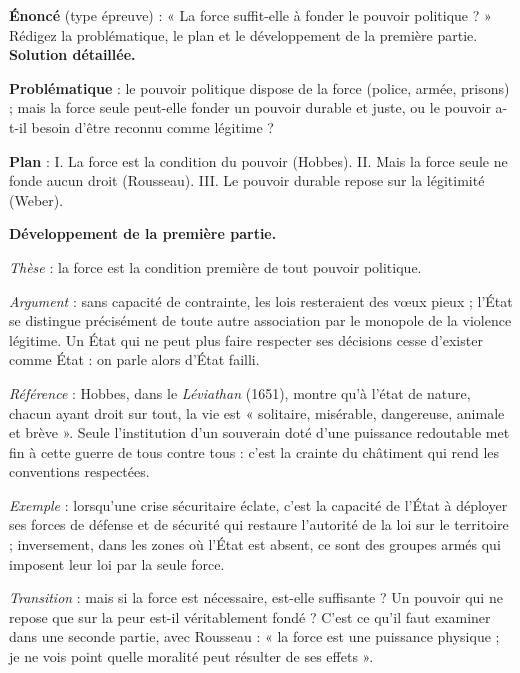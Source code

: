 \documentclass[11pt]{article}
\begin{document}
\begin{exoresolu}
\textbf{Énoncé} (type épreuve) : « La force suffit-elle à fonder le pouvoir politique ? » Rédigez la problématique, le plan et le développement de la première partie.
\tcblower
\textbf{Solution détaillée.}

\textbf{Problématique} : le pouvoir politique dispose de la force (police, armée, prisons) ; mais la force seule peut-elle fonder un pouvoir durable et juste, ou le pouvoir a-t-il besoin d'être reconnu comme légitime ?

\textbf{Plan} : I. La force est la condition du pouvoir (Hobbes). II. Mais la force seule ne fonde aucun droit (Rousseau). III. Le pouvoir durable repose sur la légitimité (Weber).

\textbf{Développement de la première partie.}

\textit{Thèse} : la force est la condition première de tout pouvoir politique.

\textit{Argument} : sans capacité de contrainte, les lois resteraient des vœux pieux ; l'État se distingue précisément de toute autre association par le monopole de la violence légitime. Un État qui ne peut plus faire respecter ses décisions cesse d'exister comme État : on parle alors d'État failli.

\textit{Référence} : Hobbes, dans le \emph{Léviathan} (1651), montre qu'à l'état de nature, chacun ayant droit sur tout, la vie est « solitaire, misérable, dangereuse, animale et brève ». Seule l'institution d'un souverain doté d'une puissance redoutable met fin à cette guerre de tous contre tous : c'est la crainte du châtiment qui rend les conventions respectées.

\textit{Exemple} : lorsqu'une crise sécuritaire éclate, c'est la capacité de l'État à déployer ses forces de défense et de sécurité qui restaure l'autorité de la loi sur le territoire ; inversement, dans les zones où l'État est absent, ce sont des groupes armés qui imposent leur loi par la seule force.

\textit{Transition} : mais si la force est nécessaire, est-elle suffisante ? Un pouvoir qui ne repose que sur la peur est-il véritablement fondé ? C'est ce qu'il faut examiner dans une seconde partie, avec Rousseau : « la force est une puissance physique ; je ne vois point quelle moralité peut résulter de ses effets ».
\end{exoresolu}
\end{document}
